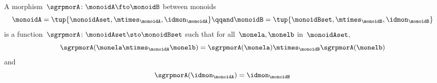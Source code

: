 \begin{ctdefinition}
  \label{def:monoid-mor}
  A morphism~$\sgrpmorA\colon \monoidA \fto \monoidB$ between monoids
  \begin{equation}
    \monoidA = \tup{\monoidAset, \mtimes_\monoidA, \idmon_\monoidA}
    \qqand
    \monoidB = \tup{\monoidBset, \mtimes_\monoidB, \idmon_\monoidB}
  \end{equation}
  is a function~$\sgrpmorA \colon \monoidAset \sto \monoidBset$ such that
  for all~$\monela, \monelb$ in~$\monoidAset$,
  \begin{equation}
    \label{eq:mon-mor-comp}
    \sgrpmorA (\monela \mtimes_{\monoidA} \monelb) = \sgrpmorA (\monela) \mtimes_{\monoidB}  \sgrpmorA(\monelb)
  \end{equation}
  and
  \begin{equation}
    \label{eq:mon-id-comp}
    \sgrpmorA (\idmon_\monoidA) = \idmon_{\monoidB}
  \end{equation}
\end{ctdefinition}
